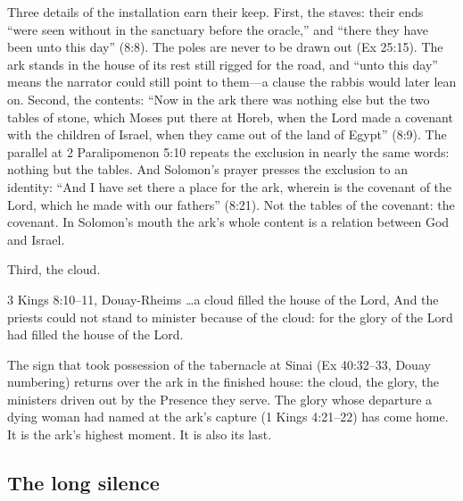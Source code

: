 Three details of the installation earn their keep. First, the staves:
their ends ``were seen without in the sanctuary before the oracle,'' and
``there they have been unto this day'' (8:8). The poles are never to be drawn
out (Ex 25:15). The ark stands in the house of its rest still rigged for the
road, and ``unto this day'' means the narrator could still point to them---a
clause the rabbis would later lean on. Second,
the contents: ``Now in the ark there was nothing else but the two tables of
stone, which Moses put there at Horeb, when the Lord made a covenant with the
children of Israel, when they came out of the land of Egypt'' (8:9). The
parallel at 2 Paralipomenon 5:10 repeats the exclusion in nearly the same
words: nothing but the tables. And Solomon's prayer presses the exclusion to an
identity: ``And I have set there a place for the ark, wherein is the covenant
of the Lord, which he made with our fathers'' (8:21). Not the tables of the
covenant: the covenant. In Solomon's mouth the ark's whole content is a
relation between God and Israel.

Third, the cloud.

\begin{witnessbox}{3 Kings 8:10--11, Douay-Rheims}
\ldots a cloud filled the house of the Lord, And the priests could not stand
to minister because of the cloud: for the glory of the Lord had filled the
house of the Lord.
\end{witnessbox}

The sign that took possession of the tabernacle at Sinai (Ex 40:32--33,
Douay numbering) returns over the ark in the finished house: the cloud, the
glory, the ministers driven out by the Presence they serve. The glory whose
departure a dying woman had named at the ark's capture (1 Kings 4:21--22)
has come home. It is the ark's highest moment. It is also its last.



\subsection{The long silence}

